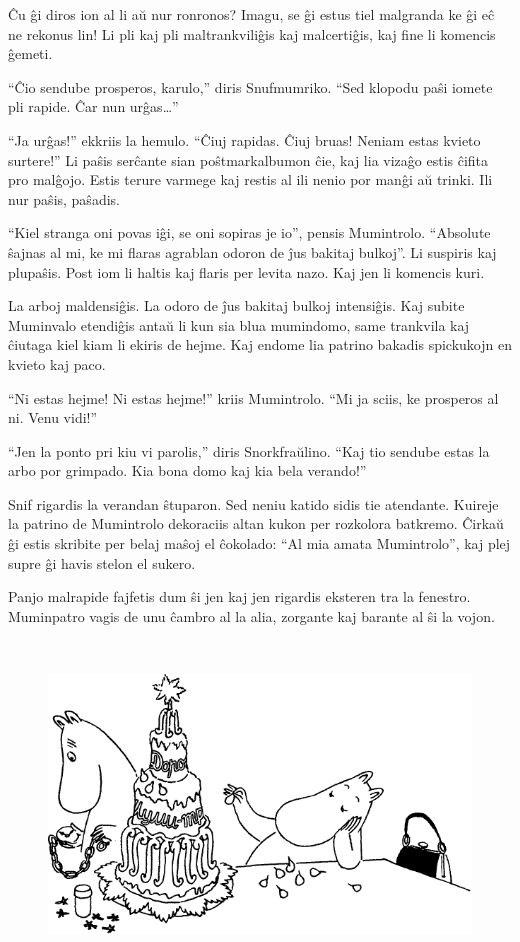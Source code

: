 Ĉu ĝi diros ion al li aŭ nur ronronos? Imagu, se ĝi estus tiel malgranda ke ĝi eĉ ne rekonus lin! Li pli kaj pli maltrankviliĝis kaj malcertiĝis, kaj fine li komencis ĝemeti.

``Ĉio sendube prosperos, karulo,'' diris Snufmumriko. ``Sed klopodu paŝi iomete pli rapide. Ĉar nun urĝas{\ldots}''

``Ja urĝas!'' ekkriis la hemulo. ``Ĉiuj rapidas. Ĉiuj bruas! Neniam estas kvieto surtere!'' Li paŝis serĉante sian poŝtmarkalbumon ĉie, kaj lia vizaĝo estis ĉifita pro malĝojo. Estis terure varmege kaj restis al ili nenio por manĝi aŭ trinki. Ili nur paŝis, paŝadis.

``Kiel stranga oni povas iĝi, se oni sopiras je io'', pensis Mumintrolo. ``Absolute ŝajnas al mi, ke mi flaras agrablan odoron de ĵus bakitaj bulkoj''. Li suspiris kaj plupaŝis. Post iom li haltis kaj flaris per levita nazo. Kaj jen li komencis kuri.

La arboj maldensiĝis. La odoro de ĵus bakitaj bulkoj intensiĝis. Kaj subite Muminvalo etendiĝis antaŭ li kun sia blua mumindomo, same trankvila kaj ĉiutaga kiel kiam li ekiris de hejme. Kaj endome lia patrino bakadis spickukojn en kvieto kaj paco.

``Ni estas hejme! Ni estas hejme!'' kriis Mumintrolo. ``Mi ja sciis, ke prosperos al ni. Venu vidi!''

``Jen la ponto pri kiu vi parolis,'' diris Snorkfraŭlino. ``Kaj tio sendube estas la arbo por grimpado. Kia bona domo kaj kia bela verando!''

Snif rigardis la verandan ŝtuparon. Sed neniu katido sidis tie atendante.
\sectionbreak
Kuireje la patrino de Mumintrolo dekoraciis altan kukon per rozkolora batkremo. Ĉirkaŭ ĝi estis skribite per belaj maŝoj el ĉokolado: ``Al mia amata Mumintrolo'', kaj plej supre ĝi havis stelon el sukero.

Panjo malrapide fajfetis dum ŝi jen kaj jen rigardis eksteren tra la fenestro. Muminpatro vagis de unu ĉambro al la alia, zorgante kaj barante al ŝi la vojon.

\begin{figure}[htbp]
\centering
\includegraphics[width=400pt,height=245pt]{9-1.png}
\caption{}
\label{9-1}
\end{figure}

